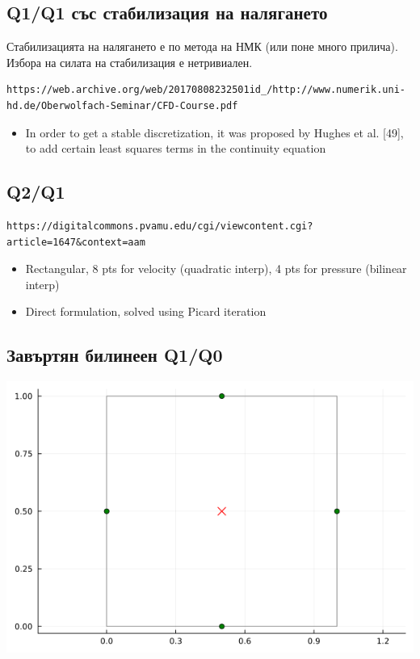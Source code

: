 \documentclass[fleqn,12pt]{article}
\begin{document}
\subsection{Q1/Q1 със стабилизация на налягането}

Стабилизацията на налягането е по метода на НМК (или поне много прилича).
Избора на силата на стабилизация е нетривиален.

\begin{verbatim}
https://web.archive.org/web/20170808232501id_/http://www.numerik.uni-hd.de/Oberwolfach-Seminar/CFD-Course.pdf
\end{verbatim}
    \begin{itemize}
        \item In order to get a stable discretization, it was proposed by Hughes et al. [49],
        to add certain least squares terms in the continuity equation
\end{itemize}
    

\subsection{Q2/Q1}
\begin{verbatim}
https://digitalcommons.pvamu.edu/cgi/viewcontent.cgi?article=1647&context=aam    
\end{verbatim}
\begin{itemize}
    \item Rectangular, 8 pts for velocity (quadratic interp), 4 pts for pressure (bilinear interp)
    \item Direct formulation, solved using Picard iteration
\end{itemize}

\subsection{Завъртян билинеен Q1/Q0}
\includegraphics[width=140mm]{img/rotbl.png}
\end{document}
